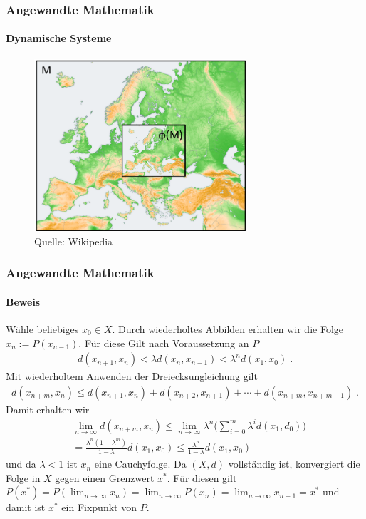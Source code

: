 \documentclass{beamer}
\begin{document}
\begin{frame}
    \frametitle{Angewandte Mathematik}
\framesubtitle{Dynamische Systeme }
\begin{figure}[H]
      \centering
    \includegraphics[width=0.7\textwidth]{images/banach}
\caption{Quelle: Wikipedia}
\end{figure}

 \end{frame}


\begin{frame}
    \frametitle{Angewandte Mathematik}
\framesubtitle{Beweis}
Wähle beliebiges $x_0 \in X$. Durch wiederholtes Abbilden erhalten wir die Folge  $x_n:= P(x_{n-1})$. Für diese Gilt nach Voraussetzung an $P$
\begin{align*}
d(x_{n+1} , x_{n}) < \lambda d(x_{n} , x_{n-1})   < \lambda^n d(x_{1} , x_{0})  \; .
\end{align*}
Mit wiederholtem Anwenden der Dreiecksungleichung gilt 
\begin{align*}
d(x_{n + m} , x_{ n}) \leq d(x_{n+1} , x_{n})  +  d(x_{n +2} , x_{n +1}) +   \cdots   +  d(x_{n + m } , x_{n +m -1}) \; .
\end{align*}
Damit erhalten wir
\begin{align*}
& \lim_{n \to \infty} d(x_{n + m} , x_{ n})   \leq  \lim_{n \to \infty}  \lambda^n \biggl( \sum_{i=0}^m \lambda^i d(x_{1} , d_{0}) \biggr)\\
& = \frac{\lambda^n (1- \lambda^m)}{1-\lambda}  d(x_{1} , x_{0}) \leq  \frac{\lambda^n}{1-\lambda}  d(x_{1} , x_{0}) 
\end{align*}
 und da $\lambda < 1$ ist $x_n$ eine Cauchyfolge.  Da $(X,d)$ vollständig ist, konvergiert die Folge in $X$ gegen einen Grenzwert $x^*$. Für diesen gilt $P(x^*) =  P (  \lim_{n \to \infty}  x_n) =  \lim_{n \to \infty} P(x_n)  =  \lim_{n \to \infty} x_{n+1} = x^*$ und damit ist $x^*$ ein Fixpunkt von $P$.

 \end{frame}
\end{document}
